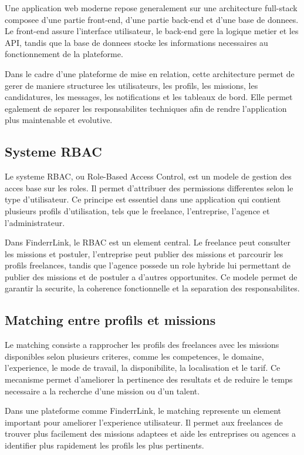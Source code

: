 Une application web moderne repose generalement sur une architecture full-stack composee d'une partie front-end, d'une partie back-end et d'une base de donnees. Le front-end assure l'interface utilisateur, le back-end gere la logique metier et les API, tandis que la base de donnees stocke les informations necessaires au fonctionnement de la plateforme.

Dans le cadre d'une plateforme de mise en relation, cette architecture permet de gerer de maniere structuree les utilisateurs, les profils, les missions, les candidatures, les messages, les notifications et les tableaux de bord. Elle permet egalement de separer les responsabilites techniques afin de rendre l'application plus maintenable et evolutive.

\subsection{Systeme RBAC}

Le systeme RBAC, ou Role-Based Access Control, est un modele de gestion des acces base sur les roles. Il permet d'attribuer des permissions differentes selon le type d'utilisateur. Ce principe est essentiel dans une application qui contient plusieurs profils d'utilisation, tels que le freelance, l'entreprise, l'agence et l'administrateur.

Dans FinderrLink, le RBAC est un element central. Le freelance peut consulter les missions et postuler, l'entreprise peut publier des missions et parcourir les profils freelances, tandis que l'agence possede un role hybride lui permettant de publier des missions et de postuler a d'autres opportunites. Ce modele permet de garantir la securite, la coherence fonctionnelle et la separation des responsabilites.

\subsection{Matching entre profils et missions}

Le matching consiste a rapprocher les profils des freelances avec les missions disponibles selon plusieurs criteres, comme les competences, le domaine, l'experience, le mode de travail, la disponibilite, la localisation et le tarif. Ce mecanisme permet d'ameliorer la pertinence des resultats et de reduire le temps necessaire a la recherche d'une mission ou d'un talent.

Dans une plateforme comme FinderrLink, le matching represente un element important pour ameliorer l'experience utilisateur. Il permet aux freelances de trouver plus facilement des missions adaptees et aide les entreprises ou agences a identifier plus rapidement les profils les plus pertinents.


